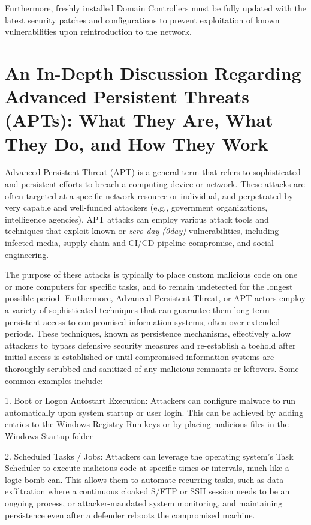 Furthermore, freshly installed Domain Controllers must be fully updated with the latest security patches and configurations to prevent exploitation of known vulnerabilities upon reintroduction to the network.

\section{An In-Depth Discussion Regarding Advanced Persistent Threats (APTs): What They Are, What They Do, and How They Work}
Advanced Persistent Threat (APT) is a general term that refers to sophisticated and persistent efforts to breach a computing device or network. These attacks are often targeted at a specific network resource or individual, and perpetrated by very capable and well-funded attackers (e.g., government organizations, intelligence agencies). APT attacks can employ various attack tools and techniques that exploit known or \textit{zero day (0day)} vulnerabilities, including infected media, supply chain and CI/CD pipeline compromise, and social engineering.

The purpose of these attacks is typically to place custom malicious code on one or more computers for specific tasks, and to remain undetected for the longest possible period.
    Furthermore, Advanced Persistent Threat, or APT actors employ a variety of sophisticated techniques that can guarantee them long-term persistent access to compromised information systems, often over extended periods. These techniques, known as persistence mechanisms, effectively allow attackers to bypass defensive security measures and re-establish a toehold after initial access is established or until compromised information systems are thoroughly scrubbed and sanitized of any malicious remnants or leftovers. Some common examples include:

1. Boot or Logon Autostart Execution: Attackers can configure malware to run automatically upon system startup or user login. This can be achieved by adding entries to the Windows Registry Run keys or by placing malicious files in the Windows Startup folder

2. Scheduled Tasks / Jobs: Attackers can leverage the operating system's Task Scheduler to execute malicious code at specific times or intervals, much like a logic bomb can. This allows them to automate recurring tasks, such as data exfiltration where a continuous cloaked S/FTP or SSH session needs to be an ongoing process, or attacker-mandated system monitoring, and maintaining persistence even after a defender reboots the compromised machine.

